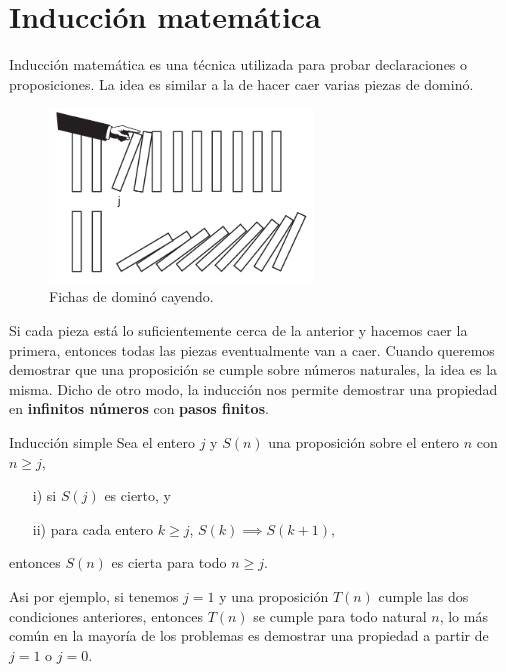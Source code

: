 \section{Inducción matemática}

Inducción matemática es una técnica utilizada para probar declaraciones o proposiciones.
La idea es similar a la de hacer caer varias piezas de dominó.
\begin{figure}[htb]
    \centering
    \includegraphics[width=7cm]{images/dominoes-fall}
    \caption{Fichas de dominó cayendo.}
    \label{fig:figure}
\end{figure}
Si cada pieza está lo suficientemente cerca de la anterior y hacemos caer la primera, entonces todas las piezas eventualmente van a caer.
Cuando queremos demostrar que una proposición se cumple sobre números naturales, la idea es la misma.
Dicho de otro modo, la inducción nos permite demostrar una propiedad en \textbf{infinitos números} con \textbf{pasos finitos}.

\begin{principle.box}{Inducción simple}{}
    Sea el entero $j$ y $S(n)$ una proposición sobre el entero $n$ con $n \geq j$,
    \begin{itemize}
        \item[i)] si $S(j)$ es cierto, y
        \item[ii)] para cada entero $k \geq j$, $S(k) \implies S(k + 1)$,
    \end{itemize}
    entonces $S(n)$ es cierta para todo $n \geq j$.
\end{principle.box}
Asi por ejemplo, si tenemos $j = 1$ y una proposición $T(n)$ cumple las dos condiciones anteriores,
entonces $T(n)$ se cumple para todo natural $n$, lo más común en la mayoría de los problemas es demostrar una propiedad
a partir de $j = 1$ o $j = 0$.

